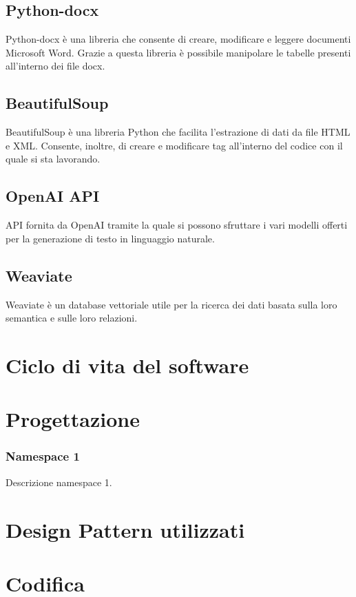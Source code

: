 \subsection{Python-docx}
Python-docx è una libreria che consente di creare, modificare e leggere documenti Microsoft Word.
Grazie a questa libreria è possibile manipolare le tabelle presenti all'interno dei file docx.
\subsection{BeautifulSoup}
BeautifulSoup è una libreria Python che facilita l'estrazione di dati da file HTML e XML.
Consente, inoltre, di creare e modificare tag all'interno del codice con il quale si sta lavorando.
\subsection{OpenAI API}
API fornita da OpenAI tramite la quale si possono sfruttare i vari modelli offerti per la generazione di testo in linguaggio naturale.
\subsection{Weaviate}
\label{subsec:weav}
Weaviate è un database vettoriale utile per la ricerca dei dati basata sulla loro semantica e sulle loro relazioni. 

\section{Ciclo di vita del software}
\label{sec:ciclo-vita-software}

\section{Progettazione}
\label{sec:progettazione}

\subsubsection{Namespace 1} %
Descrizione namespace 1.

\begin{namespacedesc}
\end{namespacedesc}


\section{Design Pattern utilizzati}

\section{Codifica}
